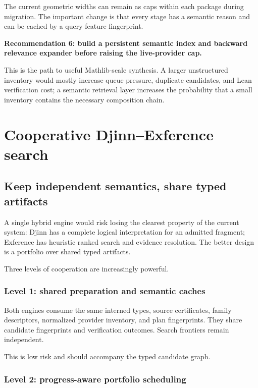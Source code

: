\documentclass[11pt]{article}
\newcommand{\Djinn}{Djinn}
\newcommand{\Exference}{Exference}
\newenvironment{recommendation}[1]
{\par\medskip\noindent\colorbox{GoodBg}{\parbox{\dimexpr\linewidth-2\fboxsep\relax}{\sffamily\bfseries #1}}\par\smallskip}
{\par\medskip}
\begin{document}
The current geometric widths can remain as caps within each package during
migration.  The important change is that every stage has a semantic reason and
can be cached by a query feature fingerprint.

\begin{recommendation}{Recommendation 6: build a persistent semantic index and backward relevance expander before raising the live-provider cap.}
This is the path to useful Mathlib-scale synthesis.  A larger unstructured
inventory would mostly increase queue pressure, duplicate candidates, and Lean
verification cost; a semantic retrieval layer increases the probability that a
small inventory contains the necessary composition chain.
\end{recommendation}

\section{Cooperative Djinn--Exference search}
\label{sec:cooperation}

\subsection{Keep independent semantics, share typed artifacts}

A single hybrid engine would risk losing the clearest property of the current
system: \Djinn{} has a complete logical interpretation for an admitted
fragment; \Exference{} has heuristic ranked search and evidence resolution.
The better design is a portfolio over shared typed artifacts.

Three levels of cooperation are increasingly powerful.

\subsubsection{Level 1: shared preparation and semantic caches}

Both engines consume the same interned types, source certificates, family
descriptors, normalized provider inventory, and plan fingerprints.  They share
candidate fingerprints and verification outcomes.  Search frontiers remain
independent.

This is low risk and should accompany the typed candidate graph.

\subsubsection{Level 2: progress-aware portfolio scheduling}
\end{document}
